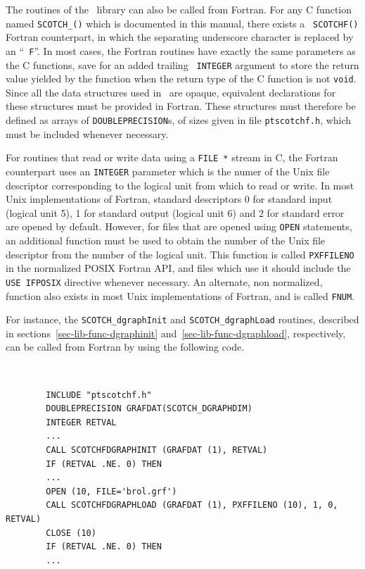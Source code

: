 The routines of the \libscotch\ library can also be called from
Fortran. For any C function named {\tt SCOTCH\_()} which is documented in this manual, there exists a {\tt
SCOTCHF()} Fortran counterpart, in which
the separating underscore character is replaced by an ``{\tt
F}''. In most cases, the Fortran routines have exactly the same
parameters as the C functions, save for an added trailing {\tt
INTEGER} argument to store the return value yielded by the function
when the return type of the C function is not {\tt void}.
\\

Since all the data structures used in \libscotch\ are
opaque, equivalent declarations for these structures must
be provided in Fortran. These structures must therefore
be defined as arrays of {\tt DOUBLEPRECISION}s, of sizes
given in file {\tt ptscotchf.h}, which must be included whenever
necessary.

For routines that read or write data using a {\tt FILE~*} stream
in C, the Fortran counterpart uses an {\tt INTEGER} parameter which
is the numer of the Unix file descriptor corresponding to the logical
unit from which to read or write. In most Unix implementations of
Fortran, standard descriptors 0 for standard input (logical unit 5),
1 for standard output (logical unit 6) and 2 for standard error are
opened by default. However, for files that are opened using
{\tt OPEN} statements, an additional function must be used to obtain
the number of the Unix file descriptor from the number of the logical
unit. This function is called \texttt{PXFFILENO} in the normalized
POSIX Fortran API, and files which use it should include the
\texttt{USE IFPOSIX} directive whenever necessary. An alternate, non
normalized, function also exists in most Unix implementations of
Fortran, and is called {\tt FNUM}.

For instance, the {\tt SCOTCH\_\lbt dgraph\lbt Init} and
{\tt SCOTCH\_\lbt dgraph\lbt Load} routines, described in
sections~\ref{sec-lib-func-dgraphinit} and~\ref{sec-lib-func-dgraphload},
respectively, can be called from Fortran by using the following code.
{\tt
\begin{verbatim}
        INCLUDE "ptscotchf.h"
        DOUBLEPRECISION GRAFDAT(SCOTCH_DGRAPHDIM)
        INTEGER RETVAL
        ...
        CALL SCOTCHFDGRAPHINIT (GRAFDAT (1), RETVAL)
        IF (RETVAL .NE. 0) THEN
        ...
        OPEN (10, FILE='brol.grf')
        CALL SCOTCHFDGRAPHLOAD (GRAFDAT (1), PXFFILENO (10), 1, 0, RETVAL)
        CLOSE (10)
        IF (RETVAL .NE. 0) THEN
        ...
\end{verbatim}
}

